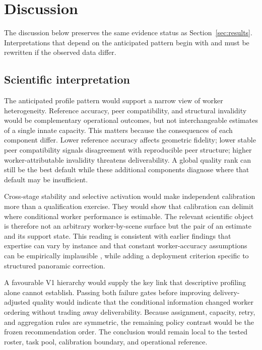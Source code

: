 \section{Discussion}
\label{sec:discussion}

The discussion below preserves the same evidence status as Section~\ref{sec:results}. Interpretations that depend on the anticipated pattern begin with \expectedresult{} and must be rewritten if the observed data differ.

\subsection{Scientific interpretation}


\expectedresult{} The anticipated profile pattern would support a narrow view of worker heterogeneity. Reference accuracy, peer compatibility, and structural invalidity would be complementary operational outcomes, but not interchangeable estimates of a single innate capacity. This matters because the consequences of each component differ. Lower reference accuracy affects geometric fidelity; lower stable peer compatibility signals disagreement with reproducible peer structure; higher worker-attributable invalidity threatens deliverability. A global quality rank can still be the best default while these additional components diagnose where that default may be insufficient.

\expectedresult{} Cross-stage stability and selective activation would make independent calibration more than a qualification exercise. They would show that calibration can delimit where conditional worker performance is estimable. The relevant scientific object is therefore not an arbitrary worker-by-scene surface but the pair of an estimate and its support state. This reading is consistent with earlier findings that expertise can vary by instance \cite{yan2010expertise} and that constant worker-accuracy assumptions can be empirically implausible \cite{burrell2023conventional}, while adding a deployment criterion specific to structured panoramic correction.

\expectedresult{} A favourable V1 hierarchy would supply the key link that descriptive profiling alone cannot establish. Passing both failure gates before improving delivery-adjusted quality would indicate that the conditional information changed worker ordering without trading away deliverability. Because assignment, capacity, retry, and aggregation rules are symmetric, the remaining policy contrast would be the frozen recommendation order. The conclusion would remain local to the tested roster, task pool, calibration boundary, and operational reference.

